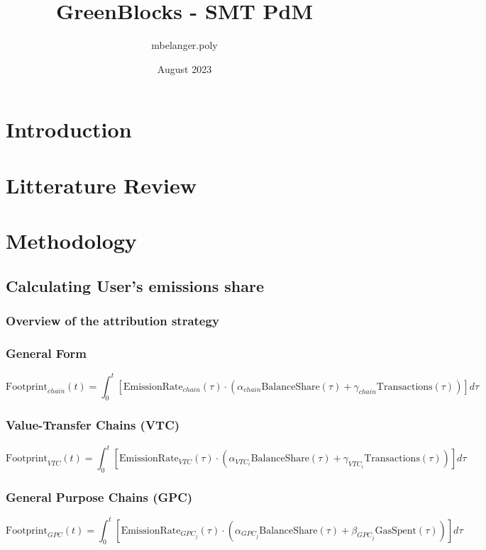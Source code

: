 \documentclass{article}
\title{GreenBlocks - SMT PdM}
\author{mbelanger.poly }
\date{August 2023}
\begin{document}
\maketitle

\section{Introduction}
\section{Litterature Review}
\section{Methodology}
\subsection{Calculating User's emissions share}
\subsubsection{Overview of the attribution strategy}
\subsubsection*{General Form}
\begin{equation}
\text{Footprint}_{chain}(t) = \int_{0}^{t} \left[ \text{EmissionRate}_{chain}(\tau) \cdot \left( \alpha_{chain} \text{BalanceShare}(\tau) + \gamma_{chain} \text{Transactions}(\tau) \right) \right] d\tau
\end{equation}





\subsubsection*{Value-Transfer Chains (VTC)}
\begin{equation}
\text{Footprint}_{VTC}(t) = \int_{0}^{t} \left[ \text{EmissionRate}_{VTC}(\tau) \cdot \left( \alpha_{VTC_i} \text{BalanceShare}(\tau) + \gamma_{VTC_i} \text{Transactions}(\tau) \right) \right] d\tau
\end{equation}

\subsubsection*{General Purpose Chains (GPC)}
\begin{equation}
\text{Footprint}_{GPC}(t) = \int_{0}^{t} \left[ \text{EmissionRate}_{GPC_j}(\tau) \cdot \left( \alpha_{GPC_j} \text{BalanceShare}(\tau) + \beta_{GPC_j} \text{GasSpent}(\tau) \right) \right] d\tau
\end{equation} 
\end{document}
